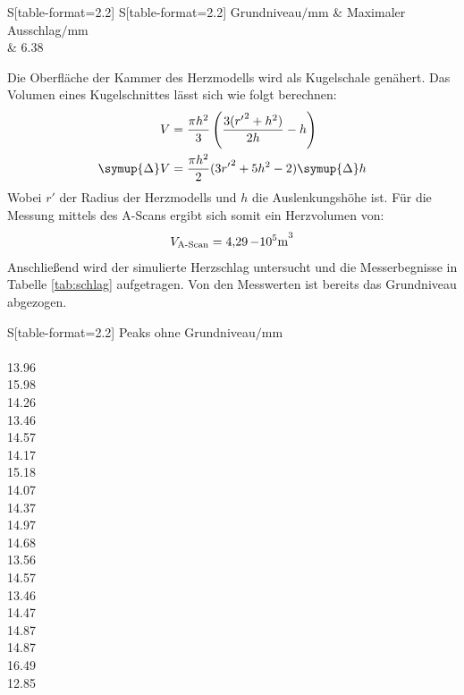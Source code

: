 \begin{table}[H]
    \caption{Messung des maximalen Ausschlags.}
    \label{maxschlag}
    \centering
    \begin{tabular}{S[table-format=2.2] S[table-format=2.2]}
        \toprule
        {Grundniveau$/\si{\milli\meter}$} &
        {Maximaler Ausschlag$/\si{\milli\meter}$} \\
                     & 6.38 \\
        \bottomrule
    \end{tabular}
\end{table}
\noindent
Die Oberfläche der Kammer des Herzmodells wird als Kugelschale genähert.
Das Volumen eines Kugelschnittes lässt sich wie folgt berechnen:
\begin{align}
	\label{kugelvol}
    V &= \frac{\pi h^2}{3}\left( \frac{3({r'}^2+h^2)}{2h} - h \right) \\
    \symup{\Delta}V &= \frac{\pi h^2}{2}(3{r'}^2+5h^2-2)\symup{\Delta}h
\end{align}
Wobei $r'$ der Radius der Herzmodells und $h$ die Auslenkungshöhe ist.
Für die Messung mittels des A-Scans ergibt sich somit ein Herzvolumen von:
\begin{equation}
	V_\text{A-Scan} = \SI{4.29}{\num{-e5}\meter\cubed}
\end{equation}
Anschließend wird der simulierte Herzschlag untersucht und die Messerbegnisse in Tabelle \ref{tab:schlag} aufgetragen.
Von den Messwerten ist bereits das Grundniveau abgezogen.
\begin{table}[H]
    \caption{Messung des Herzschlags.}
    \label{tab:schlag}
    \centering
    \begin{tabular}{S[table-format=2.2]}
        \toprule
        {Peaks ohne Grundniveau$/\si{\milli\meter}$} \\
         \\
            13.96 \\
            15.98 \\
            14.26 \\
            13.46 \\
            14.57 \\
            14.17 \\
            15.18 \\
            14.07 \\
            14.37 \\
            14.97 \\
            14.68 \\
            13.56 \\
            14.57 \\
            13.46 \\
            14.47 \\
            14.87 \\
            14.87 \\
            16.49 \\
            12.85 \\
        \bottomrule
    \end{tabular}
\end{table}
